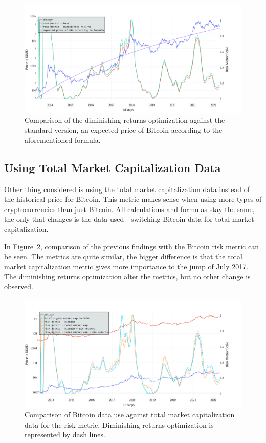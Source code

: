 \begin{figure}[!t]
    \centering
    \includegraphics[width=\columnwidth]{figures/riskmetric-dim-returns.pdf}
    \caption{Comparison of the diminishing returns optimization against the standard version, an expected price of Bitcoin according to the aforementioned formula.}
    \label{figure-dim-riskmetric}
\end{figure}

\subsection*{Using Total Market Capitalization Data}
\label{subsection-marketcap}
Other thing considered is using the total market capitalization data instead of the historical price for Bitcoin. This metric makes sense when using more types of cryptocurrencies than just Bitcoin. All calculations and formulas stay the same, the only that changes is the data used---switching Bitcoin data for total market capitalization.

In Figure~\ref{figure-total-marketcap-riskmetric}, comparison of the previous findings with the Bitcoin risk metric can be seen. The metrics are quite similar, the bigger difference is that the total market capitalization metric gives more importance to the jump of July 2017. The diminishing returns optimization alter the metrics, but no other change is observed.

\begin{figure}[!t]
    \centering
    \includegraphics[width=\columnwidth]{figures/totalmarketcap-metric.pdf}
    \caption{Comparison of Bitcoin data use against total market capitalization data for the risk metric. Diminishing returns optimization is represented by dash lines.}
    \label{figure-total-marketcap-riskmetric}
\end{figure}



